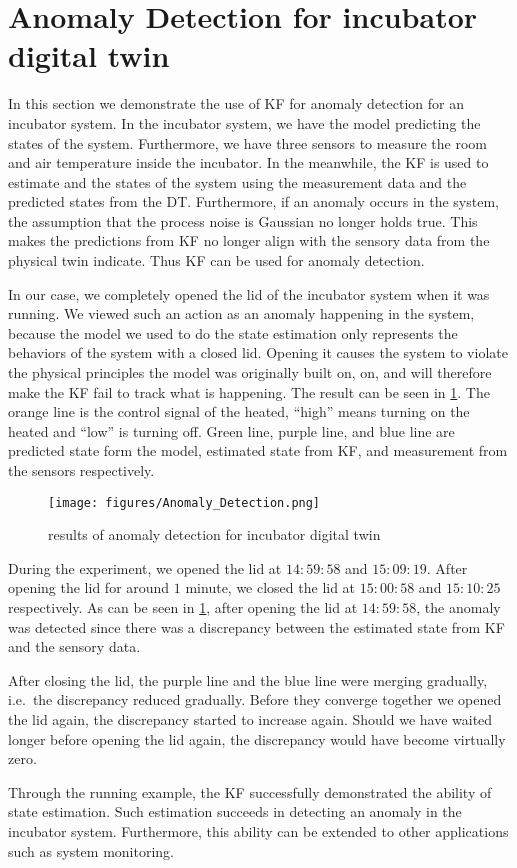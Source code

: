 \section{Anomaly Detection for incubator digital twin} \label{sec:anomaly_detection}

In this section we demonstrate the use of KF for anomaly detection for an incubator system. 
In the incubator system, we have the model predicting the states of the system. Furthermore, we have three sensors to measure the room and air temperature inside the incubator.
In the meanwhile, the KF is used to estimate and the states of the system using the measurement data and the predicted states from the DT. 
Furthermore, if an anomaly occurs in the system, the assumption that the process noise is Gaussian no longer holds true. This makes the predictions from KF no longer align with the sensory data from the physical twin indicate. Thus KF can be used for anomaly detection.  

In our case, we completely opened the lid of the incubator system when it was running. 
We viewed such an action as an anomaly happening in the system, because the model we used to do the state estimation only represents the behaviors of the system with a closed lid.
Opening it causes the system to violate the physical principles the model was originally built on, on, and will therefore make the KF fail to track what is happening.
The result can be seen in \cref{fig:anomaly_detection}. 
The orange line is the control signal of the heated, \enquote{high} means turning on the heated and \enquote{low} is turning off. 
Green line, purple line, and blue line are predicted state form the model, estimated state from KF, and measurement from the sensors respectively. 
\begin{figure}[h!] 
	\centering
	\texttt{[image: figures/Anomaly\_Detection.png]}
	\caption{results of anomaly detection for incubator digital twin}
	\label{fig:anomaly_detection}
\end{figure}

During the experiment, we opened the lid at $14:59:58$ and $15:09:19$. After opening the lid for around $1$ minute, we closed the lid at $15:00:58$ and $15:10:25$ respectively.
As can be seen in \cref{fig:anomaly_detection}, after opening the lid at $14:59:58$, the anomaly was detected since there was a discrepancy between the estimated state from KF and the sensory data. 

After closing the lid, the purple line and the blue line were merging gradually, i.e.\ the discrepancy reduced gradually. Before they converge together we opened the lid again, the discrepancy started to increase again. Should we have waited longer before opening the lid again, the discrepancy would have become virtually zero.

Through the running example, the KF successfully demonstrated the ability of state estimation. Such estimation succeeds in detecting an anomaly in the incubator system. Furthermore, this ability can be extended to other applications such as system monitoring. 

